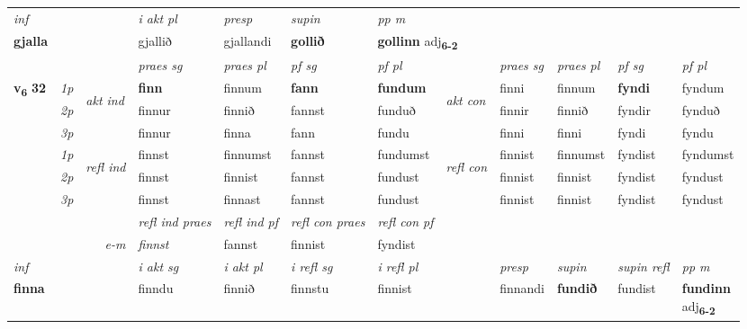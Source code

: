 \begin{longtable}[l]{X>{\footnotesize\itshape}llXXXXlXXXX}
   {\textit{inf}} & &  & \textit{i akt pl}   & \textit{presp} & \textit{supin}  & \textit{pp m} \\*
  {\textbf{gjalla}} & &  & gjallið   & gjallandi &  \textbf{gollið}  & \multicolumn{2}{l}{\textbf{gollinn} adj\textbf{\textsubscript{6-2}}} \\*

\midrule

 & &   & \textit{praes sg}  & \textit{praes pl}    & \textit{ pf sg} & \textit{pf pl} & & \textit{praes sg}  & \textit{praes pl}    & \textit{pf sg} & \textit{pf pl }  \\ \cmidrule{4-7} \cmidrule{9-12}
 \multirow{2}{*}{{{\textbf{v{\textsubscript{6}}} \Large{\textbf{32}}}}}  & 1p & \multirow{3}{*}{\begin{turn}{90}\textit{akt ind}\end{turn}} & \textbf{finn} & finnum & \textbf{fann} & \textbf{fundum} & \multirow{3}{*}{\begin{turn}{90}\textit{akt con}\end{turn}} &finni & finnum & \textbf{fyndi} & fyndum\\*
 & 2p &  &  finnur  & finnið & fannst & funduð & & finnir & finnið & fyndir & fynduð \\*
 & 3p &  & finnur & finna & fann & fundu & & finni & finni& fyndi & fyndu \\*
\cmidrule{4-7} \cmidrule{9-12}
 & 1p & \multirow{3}{*}{\begin{turn}{90}\textit{refl ind}\end{turn}}  & finnst & finnumst & fannst & fundumst & \multirow{3}{*}{\begin{turn}{90}\textit{refl con}\end{turn}}  &finnist & finnumst & fyndist & fyndumst \\*
 & 2p &  & finnst & finnist & fannst & fundust & &finnist & finnist & fyndist & fyndust \\*
 & 3p  & & finnst & finnast & fannst & fundust & & finnist & finnist& fyndist & fyndust \\*
\cmidrule{4-7} \cmidrule{9-12}

 & && \textit{refl ind praes} & \textit{refl ind pf} & \textit{refl con praes} & \textit{refl con pf} \\*
\multicolumn{3}{r}{\textit{e-m}}& finnst & fannst & finnist & fyndist \\*

\cmidrule{4-7}
   {\textit{inf}} & &  & \textit{i akt sg} & \textit{i akt pl} & \textit{i refl sg} & \textit{i refl pl} && \textit{presp} & \textit{supin} & \textit{supin refl} & \textit{pp m} \\*
  {\textbf{finna}} & && finndu  & finnið & finnstu & finnist && finnandi &  \textbf{fundið} & fundist & \specialcell{\textbf{fundinn} \\ adj\textbf{\textsubscript{6-2}}} \\*


\end{longtable}
